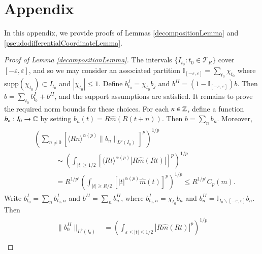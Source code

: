 \section{Appendix}

In this appendix, we provide proofs of Lemmas \ref{decompositionLemma} and \ref{pseudodifferentialCoordinateLemma}.


\begin{proof} [Proof of Lemma \ref{decompositionLemma}]
    The intervals $\{ I_{t_0} : t_0 \in \mathcal{T}_R \}$ cover $[-\varepsilon,\varepsilon]$, and so we may consider an associated partition $\mathbb{I}_{[-\varepsilon,\varepsilon]} = \sum_{t_0} \chi_{t_0}$ where $\text{supp}(\chi_{t_0}) \subset I_{t_0}$ and $|\chi_{t_0}| \leq 1$. Define $b_{t_0}^I = \chi_{t_0} b_j$ and $b^{II} = (1 - \mathbb{I}_{[-\varepsilon,\varepsilon]} ) b$. Then $b = \sum_{t_0} b_{t_0}^I + b^{II}$, and the support assumptions are satisfied. It remains to prove the required norm bounds for these choices. For each $n \in \operatorname{\mathbb{Z}}$, define a function $b_{n}: I_0 \to \operatorname{\mathbb{C}}$ by setting $b_{n}(t) = R \widehat{m}(R (t + n))$. Then $b = \sum_n b_{n}$. Moreover,
    \begin{align} \label{translationlpcalculation}
    \begin{split}
        &\left( \sum_{n \neq 0} \left[ \langle R n \rangle^{\alpha(p)} \| b_{n} \|_{L^p(I_0)} \right]^p \right)^{1/p}\\
        &\quad\quad\quad \sim \left( \int_{|t| \geq 1/2} \left[ \langle R t \rangle^{\alpha(p)} |R \widehat{m}(R t)| \right]^p \right)^{1/p}\\
        &\quad\quad\quad = R^{1/p'} \left( \int_{|t| \geq R/2} \left[ |t|^{\alpha(p)} \widehat{m}(t) \right]^p \right)^{1/p} \leq R^{1/p'} C_p(m).
    \end{split}
    \end{align}
    Write $b_{t_0}^I = \sum_n b_{t_0,n}^I$ and $b^{II} = \sum_n b_{n}^{II}$, where $b_{t_0,n}^I = \chi_{t_0} b_n$ and $b_n^{II} = \mathbb{I}_{I_0 \smallsetminus [-\varepsilon, \varepsilon] } b_{n}$. Then
    \begin{align} \label{zerobj0iicalculation}
    \begin{split}
        \| b_{0}^{II} \|_{L^p(I_0)} &= \left( \int_{\varepsilon \leq |t| \leq 1/2} |R \widehat{m}(R t)|^p \right)^{1/p}\\

\end{split}
\end{align}
\end{proof}
